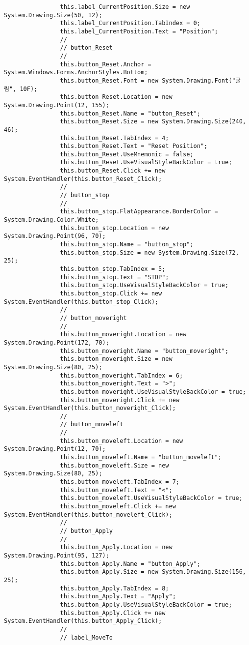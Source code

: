 \begin{lstlisting}
				this.label_CurrentPosition.Size = new System.Drawing.Size(50, 12);
				this.label_CurrentPosition.TabIndex = 0;
				this.label_CurrentPosition.Text = "Position";
				// 
				// button_Reset
				// 
				this.button_Reset.Anchor = System.Windows.Forms.AnchorStyles.Bottom;
				this.button_Reset.Font = new System.Drawing.Font("굴림", 10F);
				this.button_Reset.Location = new System.Drawing.Point(12, 155);
				this.button_Reset.Name = "button_Reset";
				this.button_Reset.Size = new System.Drawing.Size(240, 46);
				this.button_Reset.TabIndex = 4;
				this.button_Reset.Text = "Reset Position";
				this.button_Reset.UseMnemonic = false;
				this.button_Reset.UseVisualStyleBackColor = true;
				this.button_Reset.Click += new System.EventHandler(this.button_Reset_Click);
				// 
				// button_stop
				// 
				this.button_stop.FlatAppearance.BorderColor = System.Drawing.Color.White;
				this.button_stop.Location = new System.Drawing.Point(96, 70);
				this.button_stop.Name = "button_stop";
				this.button_stop.Size = new System.Drawing.Size(72, 25);
				this.button_stop.TabIndex = 5;
				this.button_stop.Text = "STOP";
				this.button_stop.UseVisualStyleBackColor = true;
				this.button_stop.Click += new System.EventHandler(this.button_stop_Click);
				// 
				// button_moveright
				// 
				this.button_moveright.Location = new System.Drawing.Point(172, 70);
				this.button_moveright.Name = "button_moveright";
				this.button_moveright.Size = new System.Drawing.Size(80, 25);
				this.button_moveright.TabIndex = 6;
				this.button_moveright.Text = ">";
				this.button_moveright.UseVisualStyleBackColor = true;
				this.button_moveright.Click += new System.EventHandler(this.button_moveright_Click);
				// 
				// button_moveleft
				// 
				this.button_moveleft.Location = new System.Drawing.Point(12, 70);
				this.button_moveleft.Name = "button_moveleft";
				this.button_moveleft.Size = new System.Drawing.Size(80, 25);
				this.button_moveleft.TabIndex = 7;
				this.button_moveleft.Text = "<";
				this.button_moveleft.UseVisualStyleBackColor = true;
				this.button_moveleft.Click += new System.EventHandler(this.button_moveleft_Click);
				// 
				// button_Apply
				// 
				this.button_Apply.Location = new System.Drawing.Point(95, 127);
				this.button_Apply.Name = "button_Apply";
				this.button_Apply.Size = new System.Drawing.Size(156, 25);
				this.button_Apply.TabIndex = 8;
				this.button_Apply.Text = "Apply";
				this.button_Apply.UseVisualStyleBackColor = true;
				this.button_Apply.Click += new System.EventHandler(this.button_Apply_Click);
				// 
				// label_MoveTo

\end{lstlisting}
